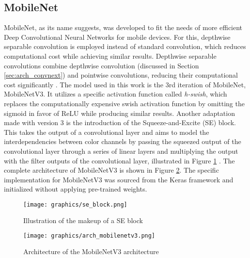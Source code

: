 \documentclass[draft,final]{vutinfth} %
\begin{document}
\subsection{MobileNet}
MobileNet, as its name suggests, was developed to fit the needs of more efficient Deep Convolutional Neural Networks for mobile devices. For this, depthwise separable convolution is employed instead of standard convolution, which reduces computational cost while achieving similar results. Depthwise separable convolutions combine depthwise convolution (discussed in Section \ref{sec:arch_convnext}) and pointwise convolutions, reducing their computational cost significantly \cite{howard_mobilenets_2017}. The model used in this work is the 3rd iteration of MobileNet, MobileNetV3. It utilizes a specific activation function called \textit{h-swish}, which replaces the computationally expensive swish activation function by omitting the sigmoid in favor of ReLU while producing similar results. Another adaptation made with version 3 is the introduction of the Squeeze-and-Excite (SE) block. This takes the output of a convolutional layer and aims to model the interdependencies between color channels by passing the squeezed output of the convolutional layer through a series of linear layers and multiplying the output with the filter outputs of the convolutional layer, illustrated in Figure \ref{fig:se_block} \cite{howard_searching_2019, erdogan_squeeze-and-excitation_2022}.
The complete architecture of MobileNetV3 is shown in Figure \ref{fig:arch_mobilenetv3}. The specific implementation for MobileNetV3 was sourced from the Keras framework \cite{chollet_keras_2015} and initialized without applying pre-trained weights.

\begin{figure}
    \centering
    \texttt{[image: graphics/se\_block.png]}
    \caption{Illustration of the makeup of a SE block \cite{erdogan_squeeze-and-excitation_2022}}
    \label{fig:se_block}
\end{figure}

\begin{figure}
    \centering
    \texttt{[image: graphics/arch\_mobilenetv3.png]}
    \caption{Architecture of the MobileNetV3 architecture \cite{elsayed_abd_elaziz_evolution_2023}}
    \label{fig:arch_mobilenetv3}
\end{figure}
\end{document}
